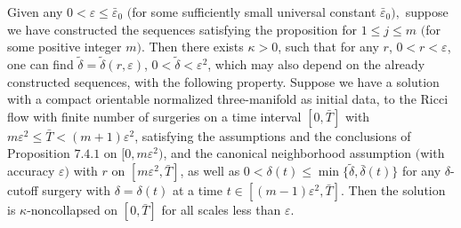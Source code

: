 \begin{lemma} 
  \label{lem:cz-surgery-noncollapsing-canonical-induction-step}

Given any $0<\varepsilon \leq \bar{\varepsilon}_0 $ $($for some
sufficiently small universal constant $\bar{\varepsilon}_0),$
suppose we have constructed the sequences satisfying the
proposition for $1\leq j\leq m$ $($for some positive integer $m)$.
Then there exists $\kappa>0$, such that for any $r$,
$0<r<\varepsilon$, one can find
$\widetilde{\delta}=\widetilde{\delta}(r,\varepsilon)$,
$0<\widetilde{\delta}<\varepsilon^2$, which may also depend on the
already constructed sequences, with the following property.
Suppose we have a solution with a compact orientable normalized
three-manifold as initial data, to the Ricci flow with finite
number of surgeries on a time interval $[0,\bar{T}]$ with
$m\varepsilon^2\leq \bar{T}<(m+1)\varepsilon^2$, satisfying the
assumptions and the conclusions of Proposition $7.4.1$ on
$[0,m\varepsilon^2)$, and the canonical neighborhood assumption
$($with accuracy $\varepsilon)$ with $r$ on
$[m\varepsilon^2,\bar{T}]$, as well as $0<\delta(t) \leq \min
\{\widetilde{\delta},\bar{\delta}(t)\}$ for any $\delta$-cutoff
surgery with $\delta =\delta(t)$ at a time
$t\in[(m-1)\varepsilon^2,\bar{T}]$. Then the solution is
$\kappa$-noncollapsed on $[0,\bar{T}]$ for all scales less than
$\varepsilon$.
\end{lemma}
